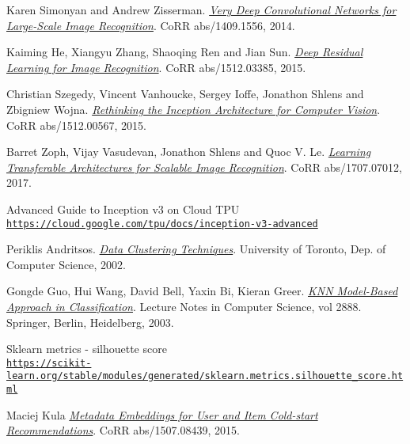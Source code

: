 \begin{thebibliography}{9}
	\hypertarget{SimonyanKarenZissermanAndrew}{} 
	Karen Simonyan and Andrew Zisserman.
	\textit{\href{https://arxiv.org/abs/1409.1556}{Very Deep Convolutional Networks for Large-Scale Image Recognition}}.
	 CoRR abs/1409.1556, 2014.
	 
	\hypertarget{KaimingHeXiangyuZhangShaoqingRenJianSun}{} 
	Kaiming He, Xiangyu Zhang, Shaoqing Ren and Jian Sun.
	\textit{\href{https://arxiv.org/abs/1512.03385}{Deep Residual Learning for Image Recognition}}.
	 CoRR abs/1512.03385, 2015.

	\hypertarget{Szegedy2016RethinkingTI}{} 
	Christian Szegedy, Vincent Vanhoucke, Sergey Ioffe, Jonathon Shlens and Zbigniew Wojna.
	\textit{\href{http://arxiv.org/abs/1512.00567}{Rethinking the Inception Architecture for Computer Vision}}.
	 CoRR abs/1512.00567, 2015.	
	
	\hypertarget{Zoph2018LearningTA}{} 
	Barret Zoph, Vijay Vasudevan, Jonathon Shlens and Quoc V. Le.
	\textit{\href{https://arxiv.org/abs/1707.07012}{Learning Transferable Architectures for Scalable Image Recognition}}.
	 CoRR abs/1707.07012, 2017.	
	
	\hypertarget{guideinceptionv3}{} 
	Advanced Guide to Inception v3 on Cloud TPU
	\\\texttt{\url{https://cloud.google.com/tpu/docs/inception-v3-advanced}}
	
	\hypertarget{dataclusteringtechniques}{} 
	Periklis Andritsos.
	\textit{\href{http://www.cs.toronto.edu/~periklis/pubs/depth.pdf}{Data Clustering Techniques}}.
	 University of Toronto, Dep. of Computer Science, 2002.	
	
	\hypertarget{gongdeguo}{} 
	Gongde Guo, Hui Wang, David Bell, Yaxin Bi, Kieran Greer.
	\textit{\href{http://citeseerx.ist.psu.edu/viewdoc/download?doi=10.1.1.2.815&rep=rep1&type=pdf}{KNN Model-Based Approach in Classification}}.
	Lecture Notes in Computer Science, vol 2888. Springer, Berlin, Heidelberg, 2003.

	\hypertarget{silhouette}{} 
	Sklearn metrics - silhouette score
	\\\texttt{\url{https://scikit-learn.org/stable/modules/generated/sklearn.metrics.silhouette_score.html}}
	
	\hypertarget{maciejlightfm}{} 
	Maciej Kula
	\textit{\href{https://arxiv.org/abs/1507.08439}{Metadata Embeddings for User and Item Cold-start Recommendations}}.
	CoRR abs/1507.08439, 2015.
	

\end{thebibliography}
